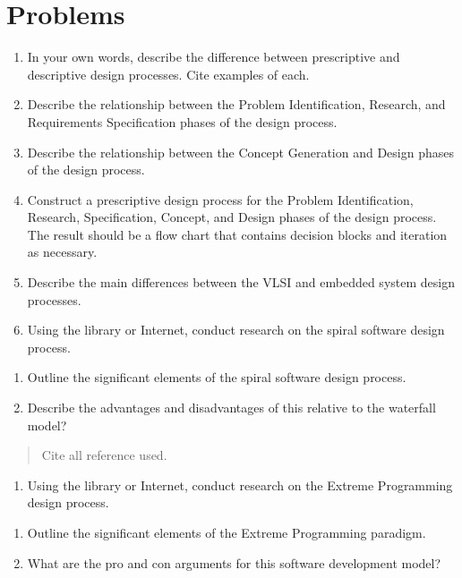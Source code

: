 \documentclass[a4paper,10pt]{book}
\begin{document}
\section{Problems}\label{problems}

\begin{enumerate}
\def\labelenumi{\arabic{enumi}.}
\item
  In your own words, describe the difference between prescriptive and
  descriptive design processes. Cite examples of each.
\item
  Describe the relationship between the Problem Identification,
  Research, and Requirements Specification phases of the design process.
\item
  Describe the relationship between the Concept Generation and Design
  phases of the design process.
\item
  Construct a prescriptive design process for the Problem
  Identification, Research, Specification, Concept, and Design phases of
  the design process. The result should be a flow chart that contains
  decision blocks and iteration as necessary.
\item
  Describe the main differences between the VLSI and embedded system
  design processes.
\item
  Using the library or Internet, conduct research on the spiral software
  design process.
\end{enumerate}

\begin{enumerate}
\def\labelenumi{\alph{enumi})}
\item
  Outline the significant elements of the spiral software design
  process.
\item
  Describe the advantages and disadvantages of this relative to the
  waterfall model?
\end{enumerate}

\begin{quote}
Cite all reference used.
\end{quote}

\begin{enumerate}
\def\labelenumi{\arabic{enumi}.}
\item
  Using the library or Internet, conduct research on the Extreme
  Programming design process.
\end{enumerate}

\begin{enumerate}
\def\labelenumi{\alph{enumi})}
\item
  Outline the significant elements of the Extreme Programming paradigm.
\item
  What are the pro and con arguments for this software development
  model?
\end{enumerate}
\end{document}
